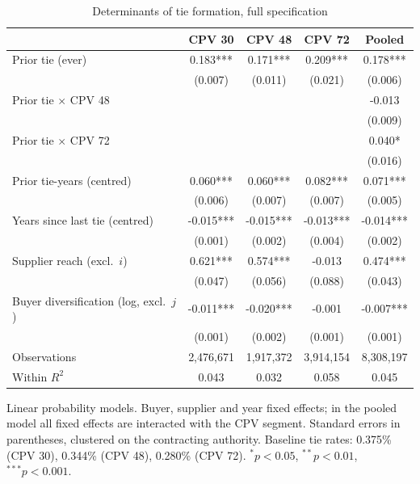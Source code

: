 \begin{table}[htbp]
\centering
\begin{threeparttable}
\caption{Determinants of tie formation, full specification}
\label{tab:panel-main}
\begin{tabular}{lcccc}
\toprule
 & CPV 30 & CPV 48 & CPV 72 & Pooled \\
\midrule
Prior tie (ever) & 0.183*** & 0.171*** & 0.209*** & 0.178*** \\
 & (0.007) & (0.011) & (0.021) & (0.006) \\
Prior tie $\times$ CPV 48 &  &  &  & -0.013 \\
 &  &  &  & (0.009) \\
Prior tie $\times$ CPV 72 &  &  &  & 0.040* \\
 &  &  &  & (0.016) \\
Prior tie-years (centred) & 0.060*** & 0.060*** & 0.082*** & 0.071*** \\
 & (0.006) & (0.007) & (0.007) & (0.005) \\
Years since last tie (centred) & -0.015*** & -0.015*** & -0.013*** & -0.014*** \\
 & (0.001) & (0.002) & (0.004) & (0.002) \\
Supplier reach (excl.\ $i$) & 0.621*** & 0.574*** & -0.013 & 0.474*** \\
 & (0.047) & (0.056) & (0.088) & (0.043) \\
Buyer diversification (log, excl.\ $j$) & -0.011*** & -0.020*** & -0.001 & -0.007*** \\
 & (0.001) & (0.002) & (0.001) & (0.001) \\
\midrule
Observations & 2,476,671 & 1,917,372 & 3,914,154 & 8,308,197 \\
Within $R^2$ & 0.043 & 0.032 & 0.058 & 0.045 \\
\bottomrule
\end{tabular}
\begin{tablenotes}\small\item Linear probability models. Buyer, supplier and year fixed effects; in the pooled model all fixed effects are interacted with the CPV segment. Standard errors in parentheses, clustered on the contracting authority. Baseline tie rates: 0.375\% (CPV 30), 0.344\% (CPV 48), 0.280\% (CPV 72). $^{*}p<0.05$, $^{**}p<0.01$, $^{***}p<0.001$.\end{tablenotes}
\end{threeparttable}
\end{table}
